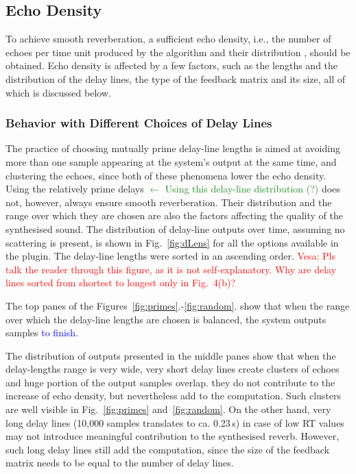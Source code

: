\documentclass[twoside,a4paper]{article}
\newcommand{\silvin}[1]{\textcolor{ForestGreen}{#1}}
\newcommand{\karolina}[1]{\textcolor{blue}{#1}}
\newcommand{\vesa}[1]{\textcolor{red}{Vesa: #1}}
\begin{document}
\subsection{Echo Density}
To achieve smooth reverberation, a sufficient echo density, i.e., the number of echoes per time unit produced by the algorithm and their distribution \cite{schlecht:2016:echo}, should be obtained. Echo density is affected by a few factors, such as the lengths and the distribution of the delay lines, the type of the feedback matrix and its size, all of which is discussed below.

\subsubsection{Behavior with Different Choices of Delay Lines}
The practice of choosing mutually prime delay-line lengths is aimed at avoiding more than one sample appearing at the system's output at the same time, and clustering the echoes, since both of these phenomena lower the echo density. Using the relatively prime delays \silvin{$\leftarrow$ Using this delay-line distribution (?)} does not, however, always ensure smooth reverberation. Their distribution and the range over which they are chosen are also the factors affecting the quality of the synthesised sound. The distribution of delay-line outputs over time, assuming no scattering is present, is shown in Fig.~\ref{fig:dLens} for all the options available in the plugin. The delay-line lengths were sorted in an ascending order. \vesa{Pls talk the reader through this figure, as it is not self-explanatory. Why are delay lines sorted from shortest to longest only in Fig.~4(b)?}

The top panes of the Figures~\ref{fig:primes}.-\ref{fig:random}. show that when the range over which the delay-line lengths are chosen is balanced, the system outputs samples \karolina{to finish}.

The distribution of outputs presented in the middle panes show that when the delay-lengths range is very wide, very short delay lines create clusters of echoes and huge portion of the output samples overlap. they do not contribute to the increase of echo density, but nevertheless add to the computation. Such clusters are well visible in Fig.~\ref{fig:primes} and~\ref{fig:random}. On the other hand, very long delay lines (10,000 samples translates to ca. 0.23\,s) in case of low RT values may not introduce meaningful contribution to the synthesised reverb. However, such long delay lines still add the computation, since the size of the feedback matrix needs to be equal to the number of delay lines. 
\end{document}
